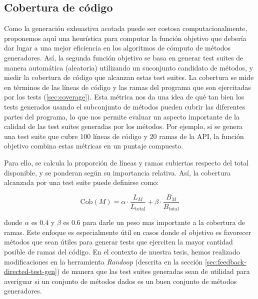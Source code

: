 \subsection{Cobertura de código}
\label{sec:fitnessRandoop}

Como la generación exhuastiva acotada puede ser costosa computacionalmente,
proponemos aquí una heurística para computar la función objetivo que debería
dar lugar a una mejor eficiencia en los algoritmos de cómputo de métodos
generadores. Así, la segunda función objetivo se basa en generar test suites
de manera automática (aleatoria) utilizando un suconjunto candidato de métodos,  
y medir la cobertura de código que alcanzan estas test suites. 
La cobertura se mide en términos de las líneas de código y las ramas del
programa que son ejercitadas por los tests (\ref{sec:coverage}).
Esta métrica nos da una idea de qué tan bien los tests generados usando el
subconjunto de métodos pueden cubrir las diferentes partes del programa, 
lo que nos permite evaluar un aspecto importante de la calidad de las test
suites generadas por los métodos.
Por ejemplo, si se genera una test suite que cubre 100 líneas de código y 20 ramas de la API, 
la función objetivo combina estas métricas en un puntaje compuesto.

Para ello, se calcula la proporción de líneas y ramas cubiertas respecto del total disponible, 
y se ponderan según su importancia relativa. Así, la cobertura alcanzada por una
test suite puede definirse como:

\[
\text{Cob}(M) = \alpha \cdot \frac{L_M}{L_{\text{total}}} + \beta \cdot \frac{B_M}{B_{\text{total}}}
\]

donde $\alpha$ es $0.4$ y $\beta$ es $0.6$ para darle un peso mas importante a la cobertura de ramas.
Este enfoque es especialmente útil en casos donde el objetivo es favorecer
métodos que sean útiles para generar tests que ejerciten la mayor cantidad
posible de ramas del código.
En el contexto de nuestra tesis, hemos realizado modificaciones en la
herramienta \emph{Randoop} (descrita en la sección
\ref{sec:feedback-directed-test-gen})
de manera que las test suites generadas sean de utilidad para averiguar si un conjunto de 
métodos dados es un buen conjunto de métodos generadores.

